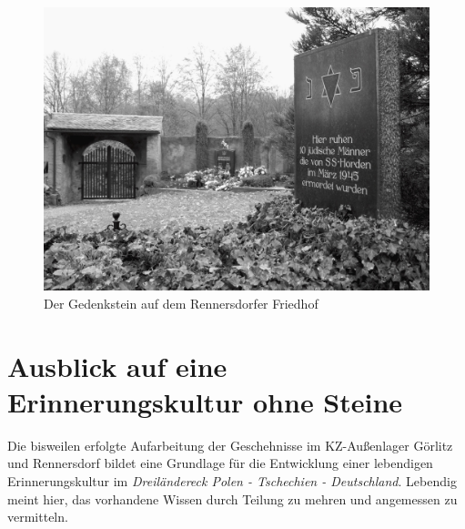 \begin{figure}
    \includegraphics[width=.47\linewidth]{images/friedrenn1}
    \caption{Der Gedenkstein auf dem Rennersdorfer Friedhof}
    \label{friedrenn}
\end{figure}


\section{Ausblick auf eine Erinnerungskultur ohne Steine}
Die bisweilen erfolgte Aufarbeitung der Geschehnisse im KZ-Außenlager
Görlitz und Rennersdorf bildet eine Grundlage für die\emph{ }Entwicklung
einer lebendigen Erinnerungskultur im \emph{Dreiländereck Polen -
Tschechien - Deutschland}. Lebendig meint hier, das vorhandene Wissen
durch Teilung zu mehren und angemessen zu vermitteln. 

